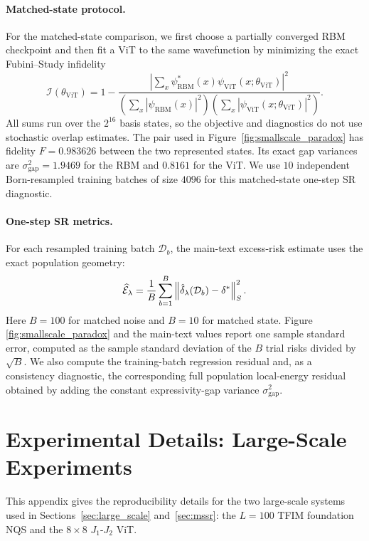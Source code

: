 \paragraph{Matched-state protocol.}
For the matched-state comparison, we first choose a partially converged RBM
checkpoint and then fit a ViT to the same wavefunction by minimizing the exact
Fubini--Study infidelity
\begin{equation}
    \mathcal{I}(\theta_{\mathrm{ViT}})
    =
    1 -
    \frac{
        \left|\sum_x \psi_{\mathrm{RBM}}^*(x)\psi_{\mathrm{ViT}}(x;\theta_{\mathrm{ViT}})\right|^2
    }{
        \left(\sum_x |\psi_{\mathrm{RBM}}(x)|^2\right)
        \left(\sum_x |\psi_{\mathrm{ViT}}(x;\theta_{\mathrm{ViT}})|^2\right)
    } .
\end{equation}
All sums run over the $2^{16}$ basis states, so the objective and diagnostics do
not use stochastic overlap estimates. The pair used in
Figure~\ref{fig:smallscale_paradox} has fidelity $F=0.983626$ between the two
represented states. Its exact gap variances are
$\sigma_{\mathrm{gap}}^2=1.9469$ for the RBM and $0.8161$ for the ViT. We use
$10$ independent Born-resampled training batches of size $4096$ for this
matched-state one-step SR diagnostic.

\paragraph{One-step SR metrics.}
For each resampled training batch \(\mathcal D_b\), the main-text excess-risk
estimate uses the exact population geometry:
\[
    \widehat{\mathcal E}_\lambda
    =
    \frac1B
    \sum_{b=1}^B
    \left\| \hat\delta_\lambda(\mathcal D_b)-\delta^* \right\|_S^2.
\]
Here $B=100$ for matched noise and $B=10$ for matched state. Figure~
\ref{fig:smallscale_paradox} and the main-text values report one sample standard
error, computed as the sample standard deviation of the $B$ trial risks
divided by \(\sqrt{B}\).
We also compute the training-batch regression residual and, as a consistency
diagnostic, the corresponding full population local-energy residual obtained by
adding the constant expressivity-gap variance \(\sigma_{\mathrm{gap}}^2\).


\section{Experimental Details: Large-Scale Experiments}\label{app:large}

This appendix gives the reproducibility details for the two large-scale systems
used in Sections~\ref{sec:large_scale} and~\ref{sec:mssr}: the $L=100$ TFIM
foundation NQS and the $8\times8$ $J_1$-$J_2$ ViT.

